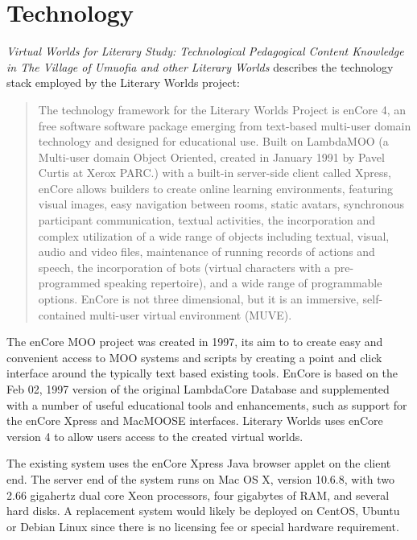 \documentclass[12pt, letterpaper]{report}
\begin{document}
\section{Technology}
\par
\textit{Virtual Worlds for Literary Study: Technological Pedagogical Content Knowledge in \textit{The Village of Umuofia} and other Literary Worlds} describes the technology stack employed by the Literary Worlds project:
\begin{quotation}
The technology framework for the Literary Worlds Project is enCore 4, an free software software package emerging from text-based multi-user domain technology and designed for educational use. Built on LambdaMOO (a Multi-user domain Object Oriented, created in January 1991 by Pavel Curtis at Xerox PARC.\cite{Wired}) with a built-in server-side client called Xpress, enCore allows builders to create online learning environments, featuring visual images, easy navigation between rooms, static avatars, synchronous participant communication, textual activities, the incorporation and complex utilization of a wide range of objects including textual, visual, audio and video files, maintenance of running records of actions and speech, the incorporation of bots (virtual characters with a pre-programmed speaking repertoire), and a wide range of programmable options.  EnCore is not three dimensional, but it is an immersive, self-contained multi-user virtual environment (MUVE). \cite{VirtWorldsTech}
\end{quotation}
\par 
The enCore MOO project was created in 1997, its aim to to create easy and convenient access to MOO systems and scripts by creating a point and click interface around the typically text based existing tools. EnCore is based on the Feb 02, 1997 version of the original LambdaCore Database and supplemented with a number of useful educational tools and enhancements, such as support for the enCore Xpress and MacMOOSE interfaces. Literary Worlds uses enCore version 4 to allow users access to the created virtual worlds.

\par
The existing system uses the enCore Xpress Java browser applet on the client end. The server end of the system runs on Mac OS X, version 10.6.8, with two 2.66 gigahertz dual core Xeon processors, four gigabytes of RAM, and several hard disks. A replacement system would likely be deployed on CentOS, Ubuntu or Debian Linux since there is no licensing fee or special hardware requirement.
\end{document}
